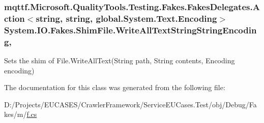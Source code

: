 \hypertarget{class_system_1_1_i_o_1_1_fakes_1_1_shim_file_a0ec7529b9b6e5c37e5081c9fa6e7e217}{
\subsubsection[{Write\-All\-Text\-String\-String\-Encoding}]{\setlength{\rightskip}{0pt plus 5cm}mqttf.\-Microsoft.\-Quality\-Tools.\-Testing.\-Fakes.\-Fakes\-Delegates.\-Action$<$string, string, global.\-System.\-Text.\-Encoding$>$ System.\-I\-O.\-Fakes.\-Shim\-File.\-Write\-All\-Text\-String\-String\-Encoding\hspace{0.3cm}{\ttfamily [static]}, {\ttfamily [set]}}}\label{class_system_1_1_i_o_1_1_fakes_1_1_shim_file_a0ec7529b9b6e5c37e5081c9fa6e7e217}


Sets the shim of File.\-Write\-All\-Text(\-String path, String contents, Encoding encoding)



The documentation for this class was generated from the following file\-:\begin{DoxyCompactItemize}
\item 
D\-:/\-Projects/\-E\-U\-C\-A\-S\-E\-S/\-Crawler\-Framework/\-Service\-E\-U\-Cases.\-Test/obj/\-Debug/\-Fakes/m/\hyperlink{m_2f_8cs}{f.\-cs}\end{DoxyCompactItemize}
